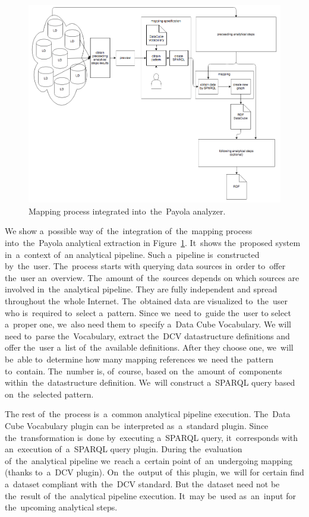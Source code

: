 \begin{figure}
	\centering
	\includegraphics[width=140mm]{img/payola-mapping.png}
	\caption{Mapping process integrated into~the~Payola analyzer.}
	\label{fig:payola-mapping}
\end{figure}

We show a~possible way of~the~integration of~the~mapping process into~the~Payola analytical extraction
in Figure~\ref{fig:payola-mapping}. It~shows the~proposed system in~a~context of~an
analytical pipeline. Such a~pipeline is~constructed by~the~user. The~process starts with querying data 
sources in~order to~offer the~user an~overview. The~amount of~the~sources depends 
on which sources are involved in~the~analytical pipeline. They are fully independent 
and spread throughout the~whole Internet. The~obtained data are visualized to~the~user who is~required to~select a~pattern. Since we~need to~guide the~user 
to select a~proper one, we~also need them to~specify a~Data Cube Vocabulary. 
We will need to~parse the~Vocabulary, extract the~DCV datastructure definitions 
and offer the~user a~list of~the~available definitions. After they choose one, we~will be~able to~determine how many mapping references we~need the~pattern to~contain. The~number is, of~course, based on~the~amount of~components 
within~the~datastructure definition. We~will construct a~SPARQL query based on~the~selected pattern.

The rest of~the~process is~a~common analytical pipeline execution. The~Data Cube 
Vocabulary plugin can be~interpreted as~a~standard plugin. Since the~transformation is~done by~executing a~SPARQL query, it~corresponds with an~execution of~a~SPARQL query plugin. During the~evaluation of~the~analytical pipeline we~reach a~certain point of~an~undergoing mapping (thanks to~a~DCV plugin). On~the~output of~this plugin, we~will for certain find a~dataset compliant
with~the~DCV standard. But the~dataset need not 
be the~result of~the~analytical pipeline execution. It~may be~used as~an~input 
for the~upcoming analytical steps.

